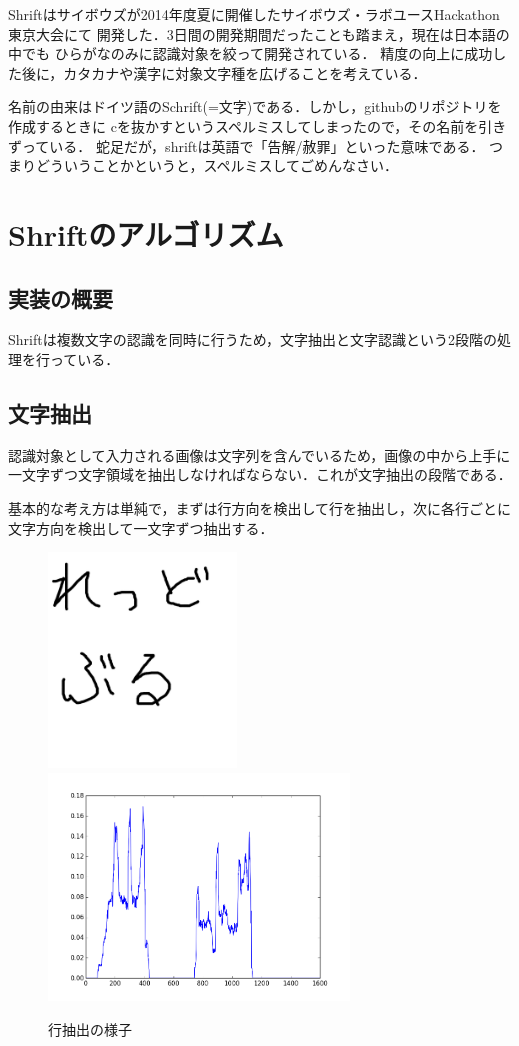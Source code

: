 \documentclass[11pt, a4paper]{jsarticle}
\begin{document}
Shriftはサイボウズが2014年度夏に開催したサイボウズ・ラボユースHackathon東京大会にて
開発した．3日間の開発期間だったことも踏まえ，現在は日本語の中でも
ひらがなのみに認識対象を絞って開発されている．
精度の向上に成功した後に，カタカナや漢字に対象文字種を広げることを考えている．

名前の由来はドイツ語のSchrift(=文字)である．しかし，githubのリポジトリを作成するときに
cを抜かすというスペルミスしてしまったので，その名前を引きずっている．
蛇足だが，shriftは英語で「告解/赦罪」といった意味である．
つまりどういうことかというと，スペルミスしてごめんなさい．

\section{Shriftのアルゴリズム}
\subsection{実装の概要}
Shriftは複数文字の認識を同時に行うため，文字抽出と文字認識という2段階の処理を行っている．

\subsection{文字抽出}
認識対象として入力される画像は文字列を含んでいるため，画像の中から上手に
一文字ずつ文字領域を抽出しなければならない．これが文字抽出の段階である．

基本的な考え方は単純で，まずは行方向を検出して行を抽出し，次に各行ごとに
文字方向を検出して一文字ずつ抽出する．

\begin{center}
	\begin{figure}[htbp]
		\includegraphics[width=5cm]{img/redbull.png}
		\includegraphics[width=8cm]{img/line.png}
		\caption{行抽出の様子}\label{fig1}
	\end{figure}
\end{center}
\end{document}
